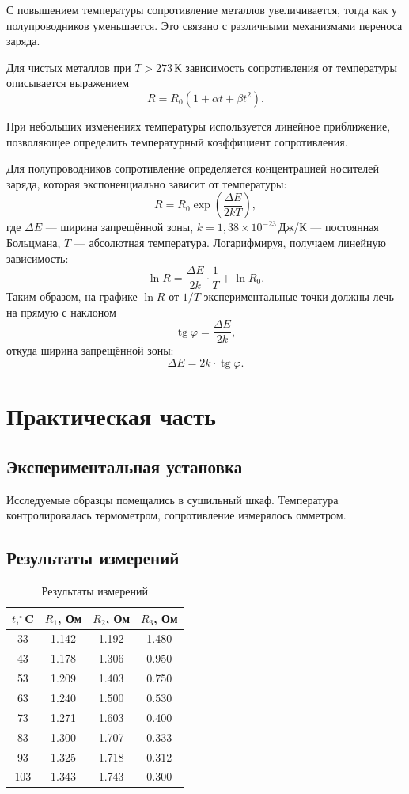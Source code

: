 \documentclass[a4paper,14pt]{extarticle}
\begin{document}
С повышением температуры сопротивление металлов увеличивается, тогда как у полупроводников уменьшается. Это связано с различными механизмами переноса заряда.

Для чистых металлов при $T > 273\,\text{К}$ зависимость сопротивления от температуры описывается выражением
\[
R = R_0(1 + \alpha t + \beta t^2).
\]

При небольших изменениях температуры используется линейное приближение, позволяющее определить температурный коэффициент сопротивления.

Для полупроводников сопротивление определяется концентрацией носителей заряда, которая экспоненциально зависит от температуры:
\[
R = R_0 \exp\!\left(\frac{\Delta E}{2kT}\right),
\]
где $\Delta E$ — ширина запрещённой зоны, $k = 1{,}38 \times 10^{-23}$\,Дж/К — постоянная Больцмана, $T$ — абсолютная температура. Логарифмируя, получаем линейную зависимость:
\[
\ln R = \frac{\Delta E}{2k} \cdot \frac{1}{T} + \ln R_0.
\]
Таким образом, на графике $\ln R$ от $1/T$ экспериментальные точки должны лечь на прямую с наклоном
\[
\operatorname{tg}\varphi = \frac{\Delta E}{2k},
\]
откуда ширина запрещённой зоны:
\[
\Delta E = 2k \cdot \operatorname{tg}\varphi.
\]

\section*{Практическая часть}

\subsection*{Экспериментальная установка}

Исследуемые образцы помещались в сушильный шкаф. Температура контролировалась термометром, сопротивление измерялось омметром.

\subsection*{Результаты измерений}

\begin{table}[h]
\centering
\caption{Результаты измерений}
\begin{tabular}{|c|c|c|c|}
\hline
$t,^\circ$C & $R_1$, Ом & $R_2$, Ом & $R_3$, Ом \\
\hline
33  & 1.142 & 1.192 & 1.480 \\
43  & 1.178 & 1.306 & 0.950 \\
53  & 1.209 & 1.403 & 0.750 \\
63  & 1.240 & 1.500 & 0.530 \\
73  & 1.271 & 1.603 & 0.400 \\
83  & 1.300 & 1.707 & 0.333 \\
93  & 1.325 & 1.718 & 0.312 \\
103 & 1.343 & 1.743 & 0.300 \\
\hline
\end{tabular}
\end{table}
\end{document}
